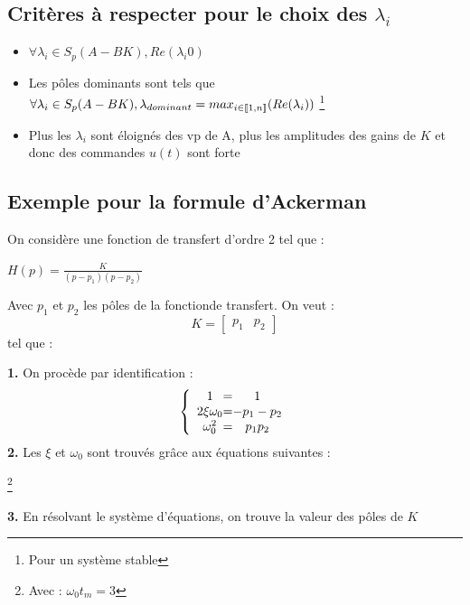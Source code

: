\subsection{Critères à respecter pour le choix des $\lambda_{i}$}
\begin{itemize}
    \item $\forall \lambda_{i} \in S_{p}(A - BK),Re(\lambda_{i} 0)$ \newline
    \item Les pôles dominants sont tels que $\forall \lambda_{i} \in S_{p}(A - BK), \newline
    \lambda_{dominant} = max_{i \in \llbracket 1 , n \rrbracket}(Re(\lambda_{i}))$ \footnote{Pour un système stable} \newline
    \item Plus les $\lambda_{i}$ sont éloignés des vp de A, plus les amplitudes des gains de $K$ et donc des commandes $u(t)$ sont forte
\end{itemize}
\newpage
\subsection{Exemple pour la formule d'Ackerman}
On considère une fonction de transfert d'ordre 2 tel que : 
\begin{center}
    \Large{$
        H(p) = \frac{K}{(p - p_{1})(p - p_{2})}
    $}
\end{center}
Avec $p_{1}$ et $p_{2}$ les pôles de la fonctionde transfert. On veut :  
\[
K = 
\begin{bmatrix}
    p_{1} & p_{2}
\end{bmatrix}
\] tel que : 
\begin{center}
\end{center}
\textbf{1.} On procède par identification :
\[
    \left \{
    \begin{array}{c @{=} c}
        1 & 1 \\
        2\xi \omega_{0} & -p_{1} - p_{2}\\
        \omega_{0}^{2} & p_{1}p_{2} 
    \end{array}
    \right.
\]
\textbf{2.} Les $\xi$ et $\omega_{0}$ sont trouvés grâce aux équations suivantes : 
\begin{center}
\end{center}
    \begin{center}
     \footnote{Avec : \Large{$
    \omega_{0}t_{m} =  3
    $}}
\end{center}
\textbf{3.} En résolvant le système d'équations, on trouve la valeur des pôles de $K$ \newline

